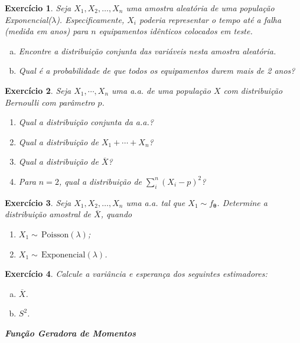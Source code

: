 \documentclass[letter,11pt]{article}
\newtheorem{exer}{Exercício}
\begin{document}
\begin{exer} \rm
Seja $X_1, X_2, \ldots, X_n$ uma amostra aleatória de uma população 
Exponencial($\lambda$). Especificamente, $X_i$ poderia representar o tempo até 
a falha (medida em anos) para $n$ equipamentos idênticos colocados em teste.
\begin{enumerate}[a)]
  \item Encontre a distribuição conjunta das variáveis nesta amostra aleatória.
  \item Qual é a probabilidade de que todos os equipamentos durem mais de 2 anos?
\end{enumerate}
\end{exer}


\begin{exer} \rm
Seja $X_1,\cdots,X_n$  uma a.a. de uma população $X$ com distribuição Bernoulli 
com parâmetro $p$.
\begin{enumerate}[\bf(a)]
  \item Qual a distribuição conjunta da a.a.?
  \item Qual a distribuição de $X_1 +\cdots+ X_n$?
  \item Qual a distribuição de $\overline{X}$?
  \item Para $n = 2$, qual a distribuição de $\sum_{i}^{n}(X_i - p)^2$?
\end{enumerate}
\end{exer}


\begin{exer} \rm
Seja $X_1, X_2, \ldots, X_n$ uma a.a. tal que $X_1 \sim f_{\boldsymbol{\theta}}$. 
Determine a distribuição amostral de $\overline{X}$, quando
\begin{enumerate}[\bf(a)]
  \item $X_1 \sim \,\mbox{Poisson}(\lambda)$;
  \item $X_1 \sim \,\mbox{Exponencial}(\lambda)$.
\end{enumerate}
\end{exer}


\begin{exer}
\item Calcule a variância e esperança dos seguintes estimadores:
\begin{enumerate}[a)]
  \item $\overline{X}$.
  \item $S^2$.
\end{enumerate}
\end{exer}

\medskip
\medskip
\noindent \textit{\textbf{Função Geradora de Momentos}}
\end{document}
